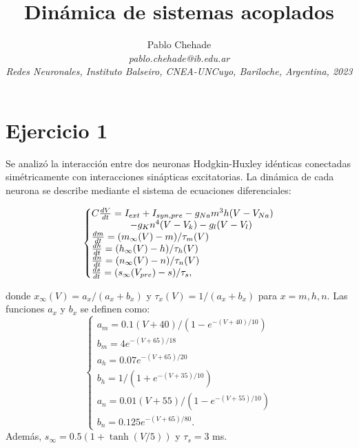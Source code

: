 \documentclass[aps,prb,twocolumn,superscriptaddress,floatfix,longbibliography]{revtex4-2}
\newcounter{para}
\begin{document}
\newcommand{\mytitle}{Dinámica de sistemas acoplados}

\title{\mytitle}

\author{Pablo Chehade \\
    \small \textit{pablo.chehade@ib.edu.ar} \\
    \small \textit{Redes Neuronales, Instituto Balseiro, CNEA-UNCuyo, Bariloche, Argentina, 2023} \\}
    
    
    
\maketitle



\section{Ejercicio 1}
Se analizó la interacción entre dos neuronas Hodgkin-Huxley idénticas conectadas simétricamente con interacciones sinápticas excitatorias. La dinámica de cada neurona se describe mediante el sistema de ecuaciones diferenciales:

\begin{equation}
\left\{\begin{array}{@{}l@{}}
    C \frac{dV}{dt} = I_{ext} + I_{syn,pre} - g_{Na}m^3h(V-V_{Na}) \\ 
    \hspace{4em} - g_{K}n^4(V - V_k) - g_l(V-V_l)    \\
    \frac{dm}{dt} = (m_\infty(V) - m)/\tau_m(V)    \\
    \frac{dh}{dt} = (h_\infty(V) - h)/\tau_h(V)    \\
    \frac{dn}{dt} = (n_\infty(V) - n)/\tau_n(V)    \\
    \frac{ds}{dt} = (s_\infty(V_{pre}) - s)/\tau_s,
    \end{array}\right.
    \label{eq:ej1_ecs_difs}
\end{equation}

donde $x_\infty(V) = a_x/(a_x + b_x)$ y $\tau_x(V) = 1/(a_x + b_x)$ para $x = m, h, n$. Las funciones $a_x$ y $b_x$ se definen como:
\[
\left\{\begin{matrix}
    a_m = 0.1(V + 40)/(1 - e^{-(V+40)/10}) \\
    b_m = 4 e^{- (V + 65)/18}    \\
    a_h = 0.07 e^{- (V+65)/20} \\ 
    b_h = 1/(1 + e^{- (V+35)/10})    \\
    a_n = 0.01(V+55)/(1-e^{-(V+55)/10}) \\
    b_n = 0.125 e^{-(V+65)/80}.
    \end{matrix}\right.
\]
Además, $s_\infty = 0.5 (1 + \tanh(V/5))$ y $\tau_s = 3$ ms.
\end{document}
